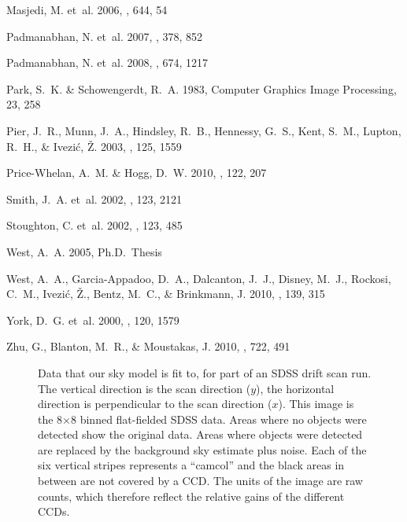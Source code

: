 \documentclass[10pt,preprint]{aastex}
\newcounter{thefigs}
\newcommand{\fignum}{\arabic{thefigs}}
\begin{document}
\begin{thebibliography}{31}
{Masjedi}, M. {et~al.} 2006, \apj, 644, 54

{Padmanabhan}, N. {et~al.} 2007, \mnras, 378, 852

{Padmanabhan}, N. {et~al.} 2008, \apj, 674, 1217

{Park}, S.~K. \& {Schowengerdt}, R.~A. 1983, Computer Graphics Image
  Processing, 23, 258

Pier, J.~R., Munn, J.~A., Hindsley, R.~B., Hennessy, G.~S., Kent, S.~M.,
  Lupton, R.~H., \& {Ivezi{\' c}}, {\v Z}. 2003, \aj, 125, 1559

{Price-Whelan}, A.~M. \& {Hogg}, D.~W. 2010, \pasp, 122, 207

{Smith}, J.~A. {et~al.} 2002, \aj, 123, 2121

Stoughton, C. {et~al.} 2002, \aj, 123, 485

{West}, A.~A. 2005, Ph.D.~Thesis

{West}, A.~A., {Garcia-Appadoo}, D.~A., {Dalcanton}, J.~J., {Disney}, M.~J.,
  {Rockosi}, C.~M., {Ivezi{\'c}}, {\v Z}., {Bentz}, M.~C., \& {Brinkmann}, J.
  2010, \aj, 139, 315

{York}, D.~G. {et~al.} 2000, \aj, 120, 1579

{Zhu}, G., {Blanton}, M.~R., \& {Moustakas}, J. 2010, \apj, 722, 491

\end{thebibliography}

\newpage
\clearpage
\clearpage

\setcounter{thefigs}{0}

\clearpage
{}
\begin{figure}
\figurenum{\fignum}
\caption{\label{fig:rawrun} Data that our sky model is fit to, for
part of an SDSS drift scan run.  The vertical direction is the scan
direction ($y$), the horizontal direction is perpendicular to the scan
direction ($x$). This image is the 8$\times$8 binned flat-fielded SDSS
data. Areas where no objects were detected show the original data.
Areas where objects were detected are replaced by the background sky
estimate plus noise. Each of the six vertical stripes represents a
``camcol'' and the black areas in between are not covered by a
CCD. The units of the image are raw counts, which therefore reflect
the relative gains of the different CCDs. }
\end{figure}
\end{document}
